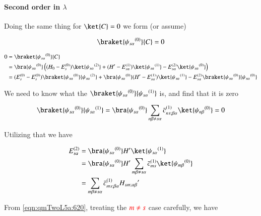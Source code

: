 \paragraph{Second order in $\lambda$}

Doing the same thing for $\ket{C} = 0$ we form (or assume)

\begin{equation}\label{eqn:qmTwoL5a:640}
\braket{{\psi_{s \alpha}}^{(0)}}{C} = 0 
\end{equation}

\begin{align*}
0 
&= \braket{{\psi_{s \alpha}}^{(0)}}{C}  \\
&=
\bra{{\psi_{s \alpha}}^{(0)}}
\left(
(H_0 - E_s^{(0)}) \ket{{\psi_{s \alpha}}^{(2)}} 
+(H' - E_{s \alpha}^{(1)}) \ket{{\psi_{s \alpha}}^{(1)}} 
-E_{s \alpha}^{(2)} \ket{{\psi_{s \alpha}}^{(0)}}  
\right) \\
&=
(E_s^{(0)} - E_s^{(0)}) 
\braket{{\psi_{s \alpha}}^{(0)}}{{\psi_{s \alpha}}^{(2)}} 
+
\bra{{\psi_{s \alpha}}^{(0)}}
(H' - E_{s \alpha}^{(1)}) \ket{{\psi_{s \alpha}}^{(1)}} 
-E_{s \alpha}^{(2)} \braket{{\psi_{s \alpha}}^{(0)}}{{\psi_{s \alpha}}^{(0)}} 
\end{align*}

We need to know what the $\braket{{\psi_{s \alpha}}^{(0)}}{{\psi_{s \alpha}}^{(1)}}$ is, and find that it is zero

\begin{equation}\label{eqn:qmTwoL5a:660}
\braket{{\psi_{s \alpha}}^{(0)}}{{\psi_{s \alpha}}^{(1)}}
=
\bra{{\psi_{s \alpha}}^{(0)}}
\sum_{n\beta \ne s\alpha} {\bar{c}_{ns;\beta \alpha}}^{(1)} \ket{{\psi_{n \beta}}^{(0)}} = 0
\end{equation}

Utilizing that we have

\begin{align*}
E_{s \alpha}^{(2)} 
&=
\bra{{\psi_{s \alpha}}^{(0)}} H' \ket{{\psi_{s \alpha}}^{(1)}}  \\
&=
\bra{{\psi_{s \alpha}}^{(0)}} H' \sum_{m \beta \ne s \alpha} {\bar{c}_{ms}}^{(1)} \ket{{\psi_{m \beta}}^{(0)}} \\
&=
\sum_{m \beta \ne s \alpha} {\bar{c}_{ms ; \beta \alpha}}^{(1)} {H_{sm ; \alpha \beta}}'
\end{align*}

From \ref{eqn:qmTwoL5a:620}, treating the $\color{red}{m \ne s}$ case carefully, we have

